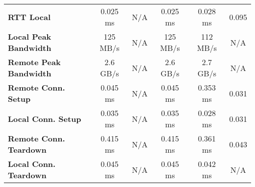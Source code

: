 \begin{table}[ht]
\begin{threeparttable}
\begin{tabular}{lccccc}
  \textbf{RTT Local}  & 0.025 ms & N/A & 0.025 ms & 0.028 ms & 0.095 \\
  \textbf{Local Peak Bandwidth}  & 125 MB/s & N/A & 125 MB/s & 112 MB/s & N/A\\
  \textbf{Remote Peak Bandwidth} & 2.6 GB/s & N/A & 2.6 GB/s & 2.7 GB/s & N/A \\
  \textbf{Remote Conn. Setup}  & 0.045 ms & N/A & 0.045 ms & 0.353 ms & 0.031 \\
  \textbf{Local Conn. Setup}  & 0.035 ms & N/A & 0.035 ms & 0.028 ms & 0.031 \\
  \textbf{Remote Conn. Teardown}  & 0.415 ms & N/A & 0.415 ms & 0.361 ms & 0.043 \\
  \textbf{Local Conn. Teardown}  & 0.045 ms & N/A & 0.045 ms & 0.042 ms & N/A \\

  \hline
  \end{tabular}
  \end{threeparttable}
  \label{Summary_Table}
\end{table}
